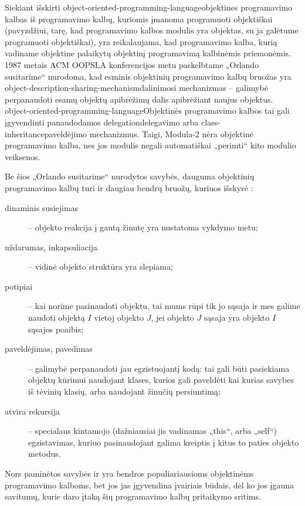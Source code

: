 Siekiant išskirti
\gls{object-oriented-programming-language}{objektines programavimo
kalbas} iš programavimo kalbų, kuriomis įmanoma programuoti
objektiškai (pavyzdžiui, tarę, kad programavimo kalbos 
modulis yra objektas, su ja galėtume programuoti objektiškai), yra
reikalaujama, kad programavimo kalba, kurią vadiname objektine
palaikytų objektinį programavimą kalbinėmis priemonėmis. 1987
metais ACM OOPSLA konferencijos metu paskelbtame „Orlando
susitarime“ 
\cite{Lieberman:1987:TO:62139.62144} nurodoma, kad esminis
objektinių programavimo kalbų bruožas yra 
\gls{object-description-sharing-mechanism}{dalinimosi 
mechanizmas} – galimybė perpanaudoti esamų objektų apibrėžimų dalis
apibrėžiant naujus objektus.
\gls{object-oriented-programming-language}{Objektinės programavimo kalbos}
tai gali įgyvendinti panaudodamos \gls{delegation}{delegavimo} arba
\gls{class-inheritance}{paveldėjimo} mechanizmus. Taigi, Modula-2 nėra
objektinė programavimo kalba, nes jos modulis negali automatiškai
„perimti“ kito modulio veiksenos.

Be šios „Orlando susitarime“ nurodytos savybės, dauguma
objektinių programavimo kalbų turi ir daugiau bendrų bruožų,
kuriuos išskyrė \cite[225-227]{types-and-programming-languages}:
\begin{description}
  \item[dinaminis susiejimas]  –
    objekto reakcija į gautą žinutę yra nustatoma vykdymo metu;
  \item[uždarumas, inkapsuliacija]  – vidinė objekto
    struktūra yra slepiama;
  \item[potipiai]  – kai norime pasinaudoti objektu, 
    tai mums rūpi tik jo sąsaja ir mes galime naudoti objektą $I$ vietoj
    objekto $J$, jei objekto $J$ sąsaja yra objekto $I$ sąsajos poaibis;
  \item[paveldėjimas, pavedimas]  – galimybė
    perpanaudoti jau egzistuojantį kodą: tai gali būti pasiekiama
    objektų kūrimui naudojant klases, kurios gali paveldėti kai kurias
    savybes iš tėvinių klasių, arba naudojant žinučių persiuntimą;
  \item[atvira rekursija]  – specialaus kintamojo
    (dažniausiai jis vadinamas „this“, arba „self“) egzistavimas, kuriuo
    pasinaudojant galima kreiptis į kitus to paties objekto metodus.
\end{description}
Nors paminėtos savybės ir yra bendros populiariausioms objektinėms
programavimo kalboms, bet jos jas įgyvendina įvairiais būdais,
dėl ko jos įgauna savitumų, kurie daro įtaką šių programavimo
kalbų pritaikymo sritims.

